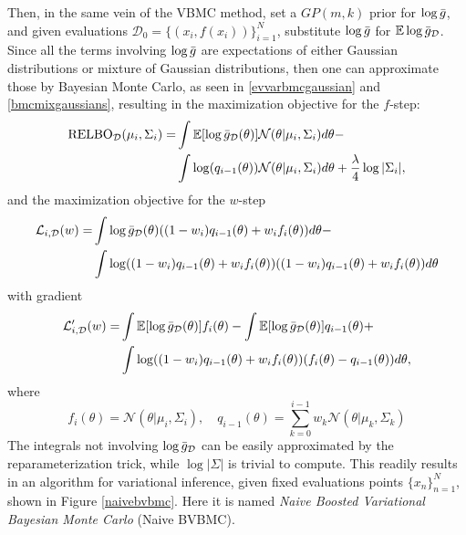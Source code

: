 Then, in the same vein of the VBMC method, set a $GP(m,k)$ prior for $\log {\bar{g}}$, and given evaluations $\mathcal{D}_0 = \{(x_i,f(x_i))\}_{i=1}^N$, substitute $\log {\bar{g}}$ for ${\mathbb E} \log {\bar{g}}_\mathcal{D}$. Since all the terms involving $\log {\bar{g}}$ are expectations of either Gaussian distributions or mixture of Gaussian distributions, then one can approximate those by Bayesian Monte Carlo, as seen in \eqref{evvarbmcgaussian} and \eqref{bmcmixgaussians}, resulting in the maximization objective for the $f$-step:
\begin{equation}\label{relbo_vbmc}
\begin{split}
\text{RELBO}_\mathcal{D}(\mu_i,\Sigma_i) = & \int {\mathbb E}[\log {\bar{g}}_\mathcal{D}(\theta)] \mathcal{N}(\theta|\mu_i,\Sigma_i) d\theta - \\ &\int \log(q_{i-1}(\theta)) \mathcal{N}(\theta|\mu_i,\Sigma_i) d\theta
+ \frac{\lambda}{4} \log |\Sigma_i|,
\end{split}
\end{equation}
and the maximization objective for the $w$-step
\begin{equation}\label{lalpha_vbmc}
\begin{split}
 \mathcal{L}_{i,\mathcal{D}}(w) = & \int \log {\bar{g}}_\mathcal{D}(\theta)
 ((1-w_{i}) q_{i-1}(\theta) + w_{i} f_{i}(\theta)) d\theta - \\
 & \int \log ((1-w_{i}) q_{i-1}(\theta) + w_{i} f_{i}(\theta)) ((1-w_{i}) q_{i-1}(\theta) + w_{i} f_{i}(\theta)) d\theta \\
\end{split}
\end{equation}
with gradient
\begin{equation}
\begin{split}
\mathcal{L}'_{i,\mathcal{D}}(w) =& \int {\mathbb E} [\log {\bar{g}}_\mathcal{D}(\theta)] f_{i}(\theta) - \int {\mathbb E} [\log {\bar{g}}_\mathcal{D}(\theta)] q_{i-1}(\theta) + \\
& \int \log((1-w_{i}) q_{i-1}(\theta) + w_{i} f_{i}(\theta)) (f_i(\theta) - q_{i-1}(\theta)) d\theta,
\end{split}
\end{equation}
where
\begin{equation}
f_i(\theta) = \mathcal{N}(\theta|\mu_i,\Sigma_i), \quad q_{i-1}(\theta) = \sum_{k=0}^{i-1} w_k \mathcal{N}(\theta|\mu_k,\Sigma_k)
\end{equation}
The integrals not involving $\log {\bar{g}}_\mathcal{D}$ can be easily approximated by the reparameterization trick, while $\log |\Sigma|$ is trivial to compute. This readily results in an algorithm for variational inference, given fixed evaluations points $\{x_n\}_{n=1}^N$, shown in Figure \ref{naivebvbmc}. Here it is named \textit{Naive Boosted Variational Bayesian Monte Carlo} (Naive BVBMC).
